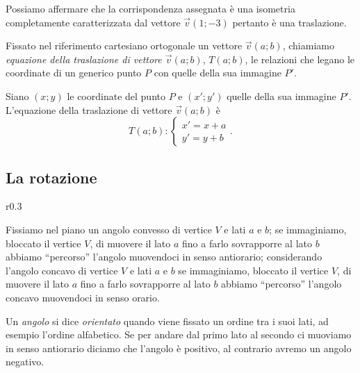 Possiamo affermare che la corrispondenza assegnata è una isometria completamente caratterizzata dal vettore $\vec{v}(1;-3)$ pertanto è una traslazione.

\begin{definizione}
Fissato nel riferimento cartesiano ortogonale un vettore $\vec{v}(a;b)$, chiamiamo \emph{equazione della traslazione di vettore $\vec{v}(a;b)$}, $T(a;b)$, le relazioni che legano le coordinate di un generico punto $P$ con quelle della sua immagine $P'$.
\end{definizione}

Siano $(x;y)$ le coordinate del punto $P$ e $(x';y')$ quelle della sua immagine $P'$. L'equazione della traslazione di vettore $\vec{v}(a;b)$ è
\[T(a;b):\begin{cases}x'=x+a\\y'=y+b\end{cases}.\]


\subsection{La rotazione}

\setlength{\intextsep}{3pt plus 2.0pt minus 2.0pt}
\begin{wrapfigure}{r}{0.3\textwidth}
	\centering
\end{wrapfigure}
Fissiamo nel piano un angolo convesso di vertice $V$ e lati $a$ e $b$; se immaginiamo, bloccato il vertice $V$, di muovere il lato $a$ fino a farlo sovrapporre al lato $b$ abbiamo ``percorso'' l'angolo muovendoci in senso antiorario; considerando l'angolo concavo di vertice $V$ e lati $a$ e $b$ se immaginiamo, bloccato il vertice $V$, di muovere il lato $a$ fino a farlo sovrapporre al lato $b$ abbiamo ``percorso'' l'angolo concavo muovendoci in senso orario.

\begin{definizione}
Un \emph{angolo} si dice \emph{orientato} quando viene fissato un ordine tra i suoi lati, ad esempio l'ordine alfabetico. Se per andare dal primo lato al secondo ci muoviamo in senso antiorario diciamo che l'angolo è positivo, al contrario avremo un angolo negativo.
\end{definizione}

